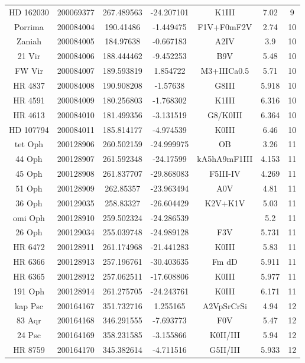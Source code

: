 \begin{table*}
\begin{tabular}{ccccccc}
HD 162030 & 200069377 & 267.489563 & -24.207101 & K1III & 7.02 & 9 \\
Porrima & 200084004 & 190.41486 & -1.449475 & F1V+F0mF2V & 2.74 & 10 \\
Zaniah & 200084005 & 184.97638 & -0.667183 & A2IV & 3.9 & 10 \\
21 Vir & 200084006 & 188.444462 & -9.452253 & B9V & 5.48 & 10 \\
FW Vir & 200084007 & 189.593819 & 1.854722 & M3+IIICa0.5 & 5.71 & 10 \\
HR 4837 & 200084008 & 190.908208 & -1.57638 & G8III & 5.918 & 10 \\
HR 4591 & 200084009 & 180.256803 & -1.768302 & K1III & 6.316 & 10 \\
HR 4613 & 200084010 & 181.499356 & -3.131519 & G8/K0III & 6.364 & 10 \\
HD 107794 & 200084011 & 185.814177 & -4.974539 & K0III & 6.46 & 10 \\
tet Oph & 200128906 & 260.502159 & -24.999975 & OB & 3.26 & 11 \\
44 Oph & 200128907 & 261.592348 & -24.17599 & kA5hA9mF1III & 4.153 & 11 \\
45 Oph & 200128908 & 261.837707 & -29.868083 & F5III-IV & 4.269 & 11 \\
51 Oph & 200128909 & 262.85357 & -23.963494 & A0V & 4.81 & 11 \\
36 Oph & 200129035 & 258.83327 & -26.604429 & K2V+K1V & 5.03 & 11 \\
omi Oph & 200128910 & 259.502324 & -24.286539 &  & 5.2 & 11 \\
26 Oph & 200129034 & 255.039748 & -24.989128 & F3V & 5.731 & 11 \\
HR 6472 & 200128911 & 261.174968 & -21.441283 & K0III & 5.83 & 11 \\
HR 6366 & 200128913 & 257.196761 & -30.403635 & Fm dD & 5.911 & 11 \\
HR 6365 & 200128912 & 257.062511 & -17.608806 & K0III & 5.977 & 11 \\
191 Oph & 200128914 & 261.275705 & -24.243761 & K0III & 6.171 & 11 \\
kap Psc & 200164167 & 351.732716 & 1.255165 & A2VpSrCrSi & 4.94 & 12 \\
83 Aqr & 200164168 & 346.291555 & -7.693773 & F0V & 5.47 & 12 \\
24 Psc & 200164169 & 358.231585 & -3.155866 & K0II/III & 5.94 & 12 \\
HR 8759 & 200164170 & 345.382614 & -4.711516 & G5II/III & 5.933 & 12 \\

\end{tabular}
\end{table*}

